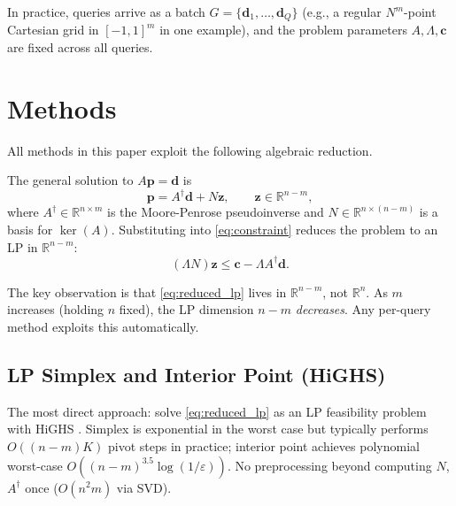 \documentclass[review,onefignum,onetabnum]{./SIAM_template/siamart171218}
\begin{document}
In practice, queries arrive as a batch $G = \{\mathbf{d}_1, \ldots, \mathbf{d}_Q\}$
(e.g., a regular $N^m$-point Cartesian grid in $[-1,1]^m$ in one example), and
the problem parameters $A, \Lambda, \mathbf{c}$ are fixed across all queries.


\section{Methods}
\label{sec:methods}

All methods in this paper exploit the following algebraic reduction.

\begin{proposition}
	\label{prop:nullspace}
	The general solution to $A\mathbf{p} = \mathbf{d}$ is
	\begin{equation}
		\label{eq:nullspace}
		\mathbf{p} = A^\dagger \mathbf{d} + N\mathbf{z}, \qquad \mathbf{z} \in \mathbb{R}^{n-m},
	\end{equation}
	where $A^\dagger \in \mathbb{R}^{n \times m}$ is the Moore-Penrose pseudoinverse and
	$N \in \mathbb{R}^{n \times (n-m)}$ is a basis for $\ker(A)$.  Substituting into
	\eqref{eq:constraint} reduces the problem to an LP in $\mathbb{R}^{n-m}$:
	\begin{equation}
		\label{eq:reduced_lp}
		(\Lambda N)\mathbf{z} \leq \mathbf{c} - \Lambda A^\dagger \mathbf{d}.
	\end{equation}
\end{proposition}

The key observation is that \eqref{eq:reduced_lp} lives in $\mathbb{R}^{n-m}$, not
$\mathbb{R}^n$.  As $m$ increases (holding $n$ fixed), the LP dimension $n - m$
\emph{decreases}.  Any per-query method exploits this automatically.

\subsection{LP Simplex and Interior Point (HiGHS)}
\label{sec:lp}

The most direct approach: solve \eqref{eq:reduced_lp} as an LP feasibility problem
with HiGHS \cite{HiGHS2018}.  Simplex is exponential in the worst case but
typically performs $O((n{-}m) K)$ pivot steps in practice;
interior point achieves polynomial worst-case $O((n{-}m)^{3.5} \log(1/\varepsilon))$.
No preprocessing beyond computing $N$, $A^\dagger$ once ($O(n^2 m)$ via SVD).
\end{document}
